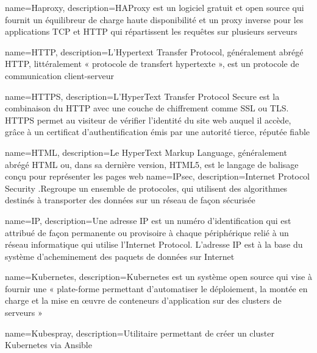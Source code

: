 {
    name=Haproxy,
    description={HAProxy est un logiciel gratuit et open source qui fournit un équilibreur de charge haute disponibilité et un proxy inverse pour les applications TCP et HTTP qui répartissent les requêtes sur plusieurs serveurs}
}

{
    name=HTTP,
    description={L’Hypertext Transfer Protocol, généralement abrégé HTTP, littéralement « protocole de transfert hypertexte », est un protocole de communication client-serveur}
}

{
    name=HTTPS,
    description={L'HyperText Transfer Protocol Secure est la combinaison du HTTP avec une couche de chiffrement comme SSL ou TLS. HTTPS permet au visiteur de vérifier l'identité du site web auquel il accède, grâce à un certificat d'authentification émis par une autorité tierce, réputée fiable}
}

{
    name=HTML,
    description={Le HyperText Markup Language, généralement abrégé HTML ou, dans sa dernière version, HTML5, est le langage de balisage conçu pour représenter les pages web}
}
{
    name=IPsec,
    description={Internet Protocol Security .Regroupe un ensemble de protocoles, qui utilisent des algorithmes destinés à transporter des données sur un réseau de façon sécurisée}
}

{
    name=IP,
    description={Une adresse IP est un numéro d'identification qui est attribué de façon permanente ou provisoire à chaque périphérique relié à un réseau informatique qui utilise l'Internet Protocol. L'adresse IP est à la base du système d'acheminement des paquets de données sur Internet}
}


{
    name=Kubernetes,
    description={Kubernetes est un système open source qui vise à fournir une « plate-forme permettant d'automatiser le déploiement, la montée en charge et la mise en œuvre de conteneurs d'application sur des clusters de serveurs »}
}

{
    name=Kubespray,
    description={Utilitaire permettant de créer un cluster Kubernetes via Ansible}
}

